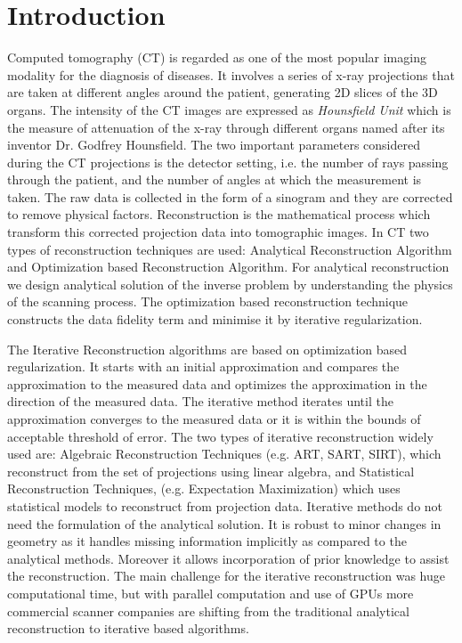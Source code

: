 \documentclass[12pt]{article}
\newcommand{\noin}{\noindent}
\begin{document}
	\section{Introduction}
	\noin Computed tomography (CT) is regarded as one of the most popular imaging modality for the diagnosis of diseases. It involves a series of x-ray projections that are taken at different angles around the patient, generating 2D slices of the 3D organs. The intensity  of the CT images are expressed as \emph{Hounsfield Unit} which is the measure of attenuation of the x-ray through different organs named after its inventor Dr. Godfrey Hounsfield. The two important parameters considered during the CT projections is the detector setting, i.e. the number of rays passing through the patient, and the number of angles at which the measurement is taken. The raw data is collected in the form of a sinogram and they are corrected to remove physical factors. Reconstruction is the mathematical process which transform this corrected projection data into tomographic images. In CT two types of reconstruction techniques are used: Analytical Reconstruction Algorithm and Optimization based Reconstruction Algorithm. For analytical reconstruction we design analytical solution of the inverse problem by understanding the physics of the scanning process. The optimization based reconstruction technique constructs the data fidelity term and minimise it by iterative regularization. 
	
	\vspace{0.2in}
	
	\noin The Iterative Reconstruction algorithms are based on optimization based regularization. It starts with an initial approximation and compares the approximation to the measured data and optimizes the approximation in the direction of the measured data. The iterative method iterates until the approximation converges to the measured data or it is within the bounds of acceptable threshold of error. The two types of iterative reconstruction widely used are: Algebraic Reconstruction Techniques (e.g. ART, SART, SIRT), which reconstruct from the set of projections using linear algebra, and Statistical Reconstruction Techniques, (e.g. Expectation Maximization) which uses statistical models to reconstruct from projection data. Iterative methods do not need the formulation of the analytical solution. It is robust to minor changes in geometry as it handles missing information implicitly as compared to the analytical methods. Moreover it allows incorporation of prior knowledge to assist the reconstruction. The main challenge for the iterative reconstruction was huge computational time, but with parallel computation and use of GPUs more commercial scanner companies are shifting from the traditional analytical reconstruction to iterative based algorithms.
	
\end{document}
